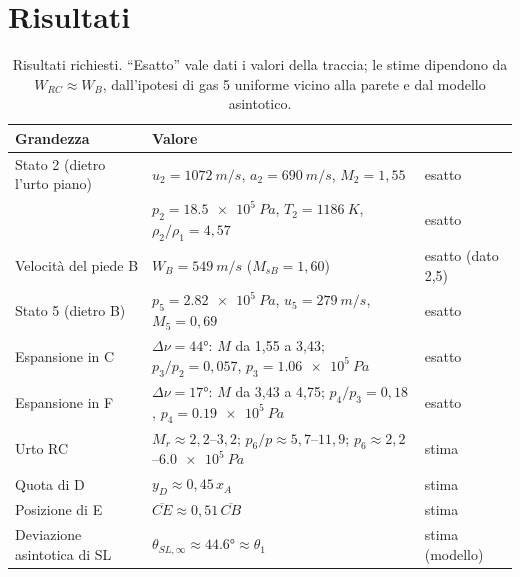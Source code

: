 \documentclass[11pt,a4paper]{article}
\begin{document}
\section{Risultati}
\begin{table}[H]
  \centering
  \small
  \begin{tabular}{p{}p{}l}
    \toprule
    Grandezza & Valore & \\
    \midrule
    Stato 2 (dietro l'urto piano) & $u_2=\SI{1072}{m/s}$, $a_2=\SI{690}{m/s}$, $M_2=1{,}55$ & esatto \\
                                  & $p_2=\SI{18.5e5}{Pa}$, $T_2=\SI{1186}{K}$, $\rho_2/\rho_1=4{,}57$ & esatto \\
    Velocità del piede B & $W_B=\SI{549}{m/s}$ ($M_{sB}=1{,}60$) & esatto (dato 2,5) \\
    Stato 5 (dietro B) & $p_5=\SI{2.82e5}{Pa}$, $u_5=\SI{279}{m/s}$, $M_5=0{,}69$ & esatto \\
    Espansione in C & $\Delta\nu=\ang{44}$: $M$ da 1,55 a 3,43; $p_3/p_2=0{,}057$, $p_3=\SI{1.06e5}{Pa}$ & esatto \\
    Espansione in F & $\Delta\nu=\ang{17}$: $M$ da 3,43 a 4,75; $p_4/p_3=0{,}18$, $p_4=\SI{0.19e5}{Pa}$ & esatto \\
    Urto RC & $M_r\approx2{,}2$--$3{,}2$; $p_6/p\approx5{,}7$--$11{,}9$; $p_6\approx2{,}2$--$\SI{6.0e5}{Pa}$ & stima \\
    Quota di D & $y_D\approx0{,}45\,x_A$ & stima \\
    Posizione di E & $\overline{CE}\approx0{,}51\,\overline{CB}$ & stima \\
    Deviazione asintotica di SL & $\theta_{SL,\infty}\approx\ang{44.6}\approx\theta_1$ & stima (modello) \\
    \bottomrule
  \end{tabular}
  \caption{Risultati richiesti. ``Esatto'' vale dati i valori della traccia; le stime dipendono da $W_{RC}\approx W_B$,
  dall'ipotesi di gas 5 uniforme vicino alla parete e dal modello asintotico.}
\end{table}

\end{document}
